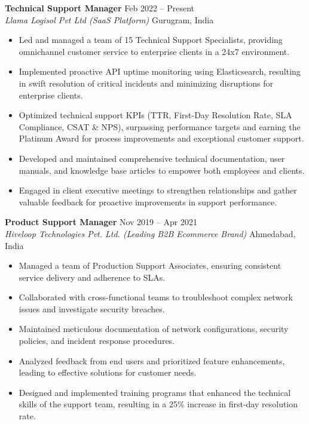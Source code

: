 \documentclass[11pt,a4paper]{article}
\begin{document}
\textbf{Technical Support Manager} \hfill Feb 2022 -- Present\\
\textit{Llama Logisol Pvt Ltd (SaaS Platform)} \hfill Gurugram, India
\begin{itemize}[leftmargin=*]
  \item Led and managed a team of 15 Technical Support Specialists, providing omnichannel customer service to enterprise clients in a 24x7 environment.
  \item Implemented proactive API uptime monitoring using Elasticsearch, resulting in swift resolution of critical incidents and minimizing disruptions for enterprise clients.
  \item Optimized technical support KPIs (TTR, First-Day Resolution Rate, SLA Compliance, CSAT & NPS), surpassing performance targets and earning the Platinum Award for process improvements and exceptional customer support.
  \item Developed and maintained comprehensive technical documentation, user manuals, and knowledge base articles to empower both employees and clients.
  \item Engaged in client executive meetings to strengthen relationships and gather valuable feedback for proactive improvements in support performance.
\end{itemize}

\textbf{Product Support Manager} \hfill Nov 2019 -- Apr 2021\\
\textit{Hiveloop Technologies Pvt. Ltd. (Leading B2B Ecommerce Brand)} \hfill Ahmedabad, India
\begin{itemize}[leftmargin=*]
  \item Managed a team of Production Support Associates, ensuring consistent service delivery and adherence to SLAs.
  \item Collaborated with cross-functional teams to troubleshoot complex network issues and investigate security breaches.
  \item Maintained meticulous documentation of network configurations, security policies, and incident response procedures.
  \item Analyzed feedback from end users and prioritized feature enhancements, leading to effective solutions for customer needs.
  \item Designed and implemented training programs that enhanced the technical skills of the support team, resulting in a 25\% increase in first-day resolution rate.
\end{itemize}
\end{document}
